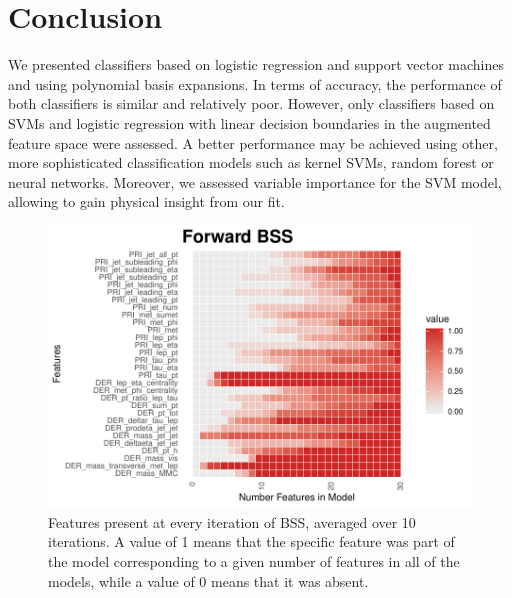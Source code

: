 \documentclass[10pt,conference,compsocconf]{IEEEtran}
\newcommand{\beginsupplement}{%
	\setcounter{table}{0}
	\renewcommand{\thetable}{S\arabic{table}}%
	\setcounter{figure}{0}
	\renewcommand{\thefigure}{S\arabic{figure}}%
}
\begin{document}
\section*{Conclusion}
We presented classifiers based on logistic regression and support vector machines and using polynomial basis expansions. In terms of accuracy, the performance of both classifiers is similar and relatively poor. However, only classifiers based on SVMs and logistic regression with linear decision boundaries in the augmented feature space were assessed. A better performance may be achieved using other, more sophisticated classification models such as kernel SVMs, random forest or neural networks. Moreover, we assessed variable importance for the SVM model, allowing to gain physical insight from our fit.   




\beginsupplement
\begin{figure}[H]
	\centering
	\includegraphics[width=\textwidth]{fwd_heat.pdf}
	\caption{Features present at every iteration of BSS, averaged over 10 iterations. A value of 1 means that the specific feature was part of the model corresponding to a given number of features in all of the models, while a value of 0 means that it was absent. }
\end{figure}
\end{document}
